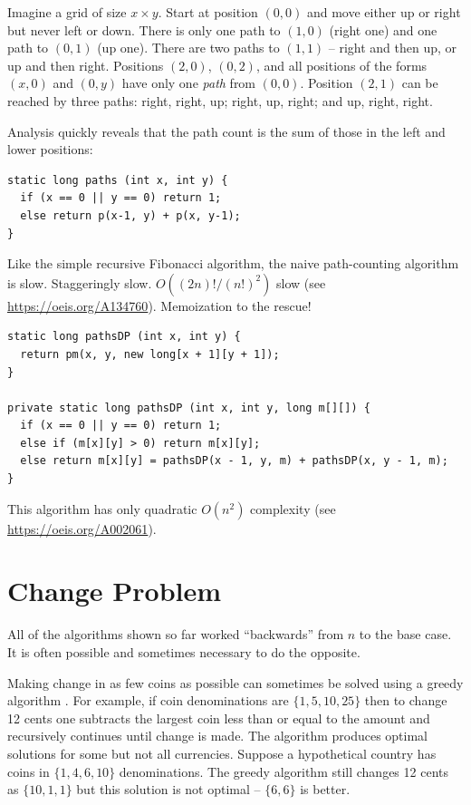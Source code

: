 \documentclass{book}
\begin{document}
Imagine a grid of size $x \times y$. Start at position $(0,0)$ and move either up or right but never left or down. There is only one path to $(1,0)$ (right one) and one path to $(0,1)$ (up one). There are two paths to $(1,1)$ -- right and then up, or up and then right. Positions $(2,0)$, $(0,2)$, and all positions of the forms $(x,0)$ and $(0,y)$ have only one \textit{path} from $(0,0)$. Position $(2,1)$ can be reached by three paths: right, right, up; right, up, right; and up, right, right. 

Analysis quickly reveals that the path count is the sum of those in the left and lower positions:

\begin{lstlisting}
static long paths (int x, int y) {
  if (x == 0 || y == 0) return 1;
  else return p(x-1, y) + p(x, y-1);
}
\end{lstlisting}

Like the simple recursive Fibonacci algorithm, the naive path-counting algorithm is slow. Staggeringly slow. $O({(2n)!}/{(n!)^2})$ slow (see \url{https://oeis.org/A134760}). Memoization to the rescue!

\begin{lstlisting}
static long pathsDP (int x, int y) {
  return pm(x, y, new long[x + 1][y + 1]);
}

private static long pathsDP (int x, int y, long m[][]) {
  if (x == 0 || y == 0) return 1;
  else if (m[x][y] > 0) return m[x][y];
  else return m[x][y] = pathsDP(x - 1, y, m) + pathsDP(x, y - 1, m);
}
\end{lstlisting}

This algorithm has only quadratic $O(n^2)$ complexity (see \url{https://oeis.org/A002061}).

\section{Change Problem}

All of the algorithms shown so far worked ``backwards'' from $n$ to the base case. It is often possible and sometimes necessary to do the opposite.

Making change in as few coins as possible can sometimes be solved using a greedy algorithm \cite{pevznerChange}. For example, if coin denominations are $\{1, 5, 10, 25\}$ then to change 12 cents one subtracts the largest coin less than or equal to the amount and recursively continues until change is made. The algorithm produces optimal solutions for some but not all currencies. Suppose a hypothetical country has coins in $\{1, 4, 6, 10\}$ denominations. The greedy algorithm still changes 12 cents as $\{10,1,1\}$ but this solution is not optimal -- $\{6,6\}$ is better.
\end{document}

